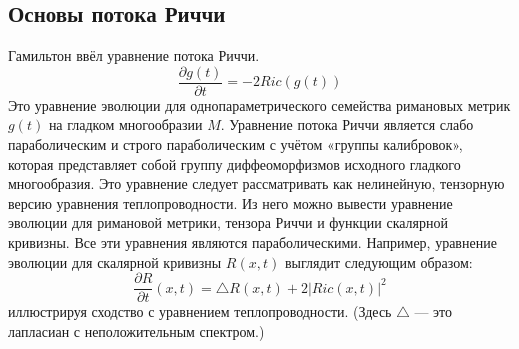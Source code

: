 \subsection{Основы потока Риччи}

Гамильтон \cite{c29} ввёл уравнение потока Риччи.
\[
\frac{\partial g(t)}{\partial t} = -2Ric(g(t))
\]
Это уравнение эволюции для однопараметрического семейства 
римановых метрик $g(t)$ на гладком многообразии $M$. 
Уравнение потока Риччи является слабо параболическим и 
строго параболическим с учётом «группы калибровок», 
которая представляет собой группу диффеоморфизмов 
исходного гладкого многообразия. 
Это уравнение следует рассматривать как нелинейную, 
тензорную версию уравнения теплопроводности. 
Из него можно вывести уравнение эволюции для римановой метрики, 
тензора Риччи и функции скалярной кривизны. 
Все эти уравнения являются параболическими. 
Например, уравнение эволюции для скалярной кривизны 
$R(x,t)$ выглядит следующим образом:
\begin{equation}
    \frac{\partial R}{\partial t}(x,t) = \bigtriangleup R(x,t)+2{| Ric(x,t)|}^2
    \label{eqn0.1}
\end{equation}
иллюстрируя сходство с уравнением теплопроводности. 
(Здесь $\bigtriangleup$ — это лапласиан с неположительным спектром.)